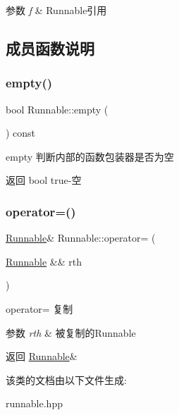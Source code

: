\begin{DoxyParams}{参数}
{\em f} & Runnable引用 \\
\hline
\end{DoxyParams}


\subsection{成员函数说明}
\mbox{\label{classRunnable_a3abba14a5cf19709cef2d299ee68acae}} 
\subsubsection{\texorpdfstring{empty()}{empty()}}
{\footnotesize\ttfamily bool Runnable\+::empty (\begin{DoxyParamCaption}{ }\end{DoxyParamCaption}) const\hspace{0.3cm}{\ttfamily [inline]}}



empty 判断内部的函数包装器是否为空 

\begin{DoxyReturn}{返回}
bool true-\/空 
\end{DoxyReturn}
\mbox{\label{classRunnable_ab41eea27867a9f54e94255851412bc77}} 
\subsubsection{\texorpdfstring{operator=()}{operator=()}}
{\footnotesize\ttfamily \hyperlink{classRunnable}{Runnable}\& Runnable\+::operator= (\begin{DoxyParamCaption}\item[{\hyperlink{classRunnable}{Runnable} \&\&}]{rth }\end{DoxyParamCaption})\hspace{0.3cm}{\ttfamily [inline]}}



operator= 复制 


\begin{DoxyParams}{参数}
{\em rth} & 被复制的\+Runnable\\
\hline
\end{DoxyParams}
\begin{DoxyReturn}{返回}
\hyperlink{classRunnable}{Runnable}\& 
\end{DoxyReturn}


该类的文档由以下文件生成\+:\begin{DoxyCompactItemize}
\item 
runnable.\+hpp\end{DoxyCompactItemize}
